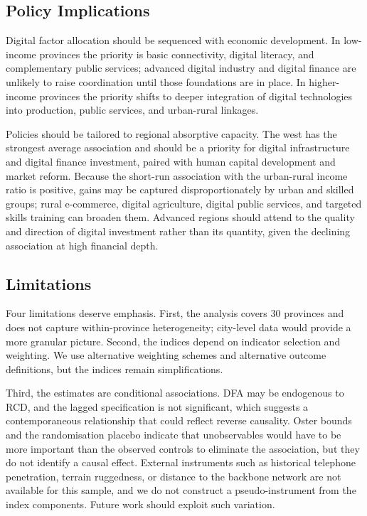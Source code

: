 \subsection{Policy Implications}

Digital factor allocation should be sequenced with economic development. In low-income provinces the priority is basic connectivity, digital literacy, and complementary public services; advanced digital industry and digital finance are unlikely to raise coordination until those foundations are in place. In higher-income provinces the priority shifts to deeper integration of digital technologies into production, public services, and urban-rural linkages.

Policies should be tailored to regional absorptive capacity. The west has the strongest average association and should be a priority for digital infrastructure and digital finance investment, paired with human capital development and market reform. Because the short-run association with the urban-rural income ratio is positive, gains may be captured disproportionately by urban and skilled groups; rural e-commerce, digital agriculture, digital public services, and targeted skills training can broaden them. Advanced regions should attend to the quality and direction of digital investment rather than its quantity, given the declining association at high financial depth.

\subsection{Limitations}\label{sec:limitations}

Four limitations deserve emphasis. First, the analysis covers 30 provinces and does not capture within-province heterogeneity; city-level data would provide a more granular picture. Second, the indices depend on indicator selection and weighting. We use alternative weighting schemes and alternative outcome definitions, but the indices remain simplifications.

Third, the estimates are conditional associations. DFA may be endogenous to RCD, and the lagged specification is not significant, which suggests a contemporaneous relationship that could reflect reverse causality. Oster bounds and the randomisation placebo indicate that unobservables would have to be more important than the observed controls to eliminate the association, but they do not identify a causal effect. External instruments such as historical telephone penetration, terrain ruggedness, or distance to the backbone network are not available for this sample, and we do not construct a pseudo-instrument from the index components. Future work should exploit such variation.

